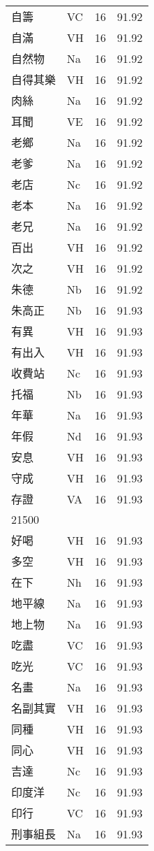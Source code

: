 \documentclass[twocolumn]{book}
\begin{document}
\begin{supertabular}{llrr}
自籌 & VC & 16 &  91.92\\
自滿 & VH & 16 &  91.92\\
自然物 & Na & 16 &  91.92\\
自得其樂 & VH & 16 &  91.92\\
肉絲 & Na & 16 &  91.92\\
耳聞 & VE & 16 &  91.92\\
老鄉 & Na & 16 &  91.92\\
老爹 & Na & 16 &  91.92\\
老店 & Nc & 16 &  91.92\\
老本 & Na & 16 &  91.92\\
老兄 & Na & 16 &  91.92\\
百出 & VH & 16 &  91.92\\
次之 & VH & 16 &  91.92\\
朱德 & Nb & 16 &  91.92\\
朱高正 & Nb & 16 &  91.93\\
有異 & VH & 16 &  91.93\\
有出入 & VH & 16 &  91.93\\
收費站 & Nc & 16 &  91.93\\
托福 & Nb & 16 &  91.93\\
年華 & Na & 16 &  91.93\\
年假 & Nd & 16 &  91.93\\
安息 & VH & 16 &  91.93\\
守成 & VH & 16 &  91.93\\
存證 & VA & 16 &  91.93\\
21500\\
好喝 & VH & 16 &  91.93\\
多空 & VH & 16 &  91.93\\
在下 & Nh & 16 &  91.93\\
地平線 & Na & 16 &  91.93\\
地上物 & Na & 16 &  91.93\\
吃盡 & VC & 16 &  91.93\\
吃光 & VC & 16 &  91.93\\
名畫 & Na & 16 &  91.93\\
名副其實 & VH & 16 &  91.93\\
同種 & VH & 16 &  91.93\\
同心 & VH & 16 &  91.93\\
吉達 & Nc & 16 &  91.93\\
印度洋 & Nc & 16 &  91.93\\
印行 & VC & 16 &  91.93\\
刑事組長 & Na & 16 &  91.93\\

\end{supertabular}
\end{document}
